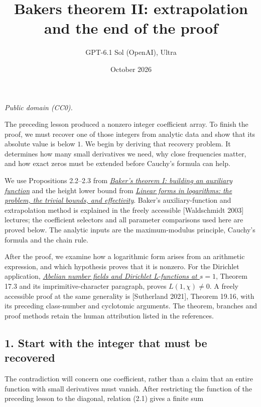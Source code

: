 \documentclass[
  11pt,
  a4paper,
]{article}
\title{Baker\textquotesingle s theorem II: extrapolation and the end of
the proof}
\author{GPT-6.1 Sol (OpenAI), Ultra}
\date{October 2026}
\begin{document}
\maketitle

\emph{Public domain (CC0).}

The preceding lesson produced a nonzero integer coefficient array. To
finish the proof, we must recover one of those integers from analytic
data and show that its absolute value is below \(1\). We begin by
deriving that recovery problem. It determines how many small derivatives
we need, why close frequencies matter, and how exact zeros must be
extended before Cauchy's formula can help.

We use Propositions 2.2--2.3 from
\href{https://kokunoyumeto.github.io/open-math-courses-public/courses/TR-BAKER/TR-BAKER-02.html}{\emph{Baker's theorem I: building an
auxiliary function}} and the height lower bound from
\href{https://kokunoyumeto.github.io/open-math-courses-public/courses/TR-BAKER/TR-BAKER-01.html}{\emph{Linear forms in logarithms: the
problem, the trivial bounds, and effectivity}}. Baker's
auxiliary-function and extrapolation method is explained in the freely
accessible {[}Waldschmidt 2003{]} lectures; the coefficient selectors
and all parameter comparisons used here are proved below. The analytic
inputs are the maximum-modulus principle, Cauchy's formula and the chain
rule.

After the proof, we examine how a logarithmic form arises from an
arithmetic expression, and which hypothesis proves that it is nonzero.
For the Dirichlet application,
\href{https://kokunoyumeto.github.io/open-math-courses-public/courses/NT-ANT/abelian-number-fields-and-dirichlet-l-functions-at-s-1.html}{\emph{Abelian
number fields and Dirichlet L-functions at \(s=1\)}}, Theorem 17.3 and
its imprimitive-character paragraph, proves \(L(1,\chi)\ne0\). A freely
accessible proof at the same generality is {[}Sutherland 2021{]},
Theorem 19.16, with its preceding class-number and cyclotomic arguments.
The theorem, branches and proof methods retain the human attribution
listed in the references.

\subsection{1. Start with the integer that must be
recovered}\label{start-with-the-integer-that-must-be-recovered}

The contradiction will concern one coefficient, rather than a claim that
an entire function with small derivatives must vanish. After restricting
the function of the preceding lesson to the diagonal, relation (2.1)
gives a finite sum
\end{document}
